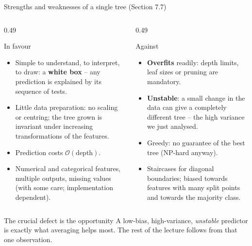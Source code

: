 \documentclass[10pt,aspectratio=169]{beamer}
\begin{document}
\begin{frame}{Strengths and weaknesses of a single tree (Section 7.7)}
\begin{columns}[T]
\begin{column}{0.49\textwidth}
\begin{block}{In favour}
\begin{itemize}
  \item Simple to understand, to interpret, to draw: a \textbf{white box} --
        any prediction is explained by its sequence of tests.
  \item Little data preparation: no scaling or centring; the tree grown is
        invariant under increasing transformations of the features.
  \item Prediction costs $\mathcal{O}(\text{depth})$.
  \item Numerical and categorical features, multiple outputs, missing values
        (with some care; implementation dependent).
\end{itemize}
\end{block}
\end{column}
\begin{column}{0.49\textwidth}
\begin{block}{Against}
\begin{itemize}
  \item \textbf{Overfits} readily: depth limits, leaf sizes or pruning are
        mandatory.
  \item \textbf{Unstable}: a small change in the data can give a completely
        different tree -- the high variance we just analysed.
  \item Greedy: no guarantee of the best tree (NP-hard anyway).
  \item Staircases for diagonal boundaries; biased towards features with many
        split points and towards the majority class.
\end{itemize}
\end{block}
\end{column}
\end{columns}
\begin{block}{The crucial defect is the opportunity}
A low-bias, high-variance, \emph{unstable} predictor is exactly what averaging
helps most.  The rest of the lecture follows from that one observation.
\end{block}
\end{frame}
\end{document}
